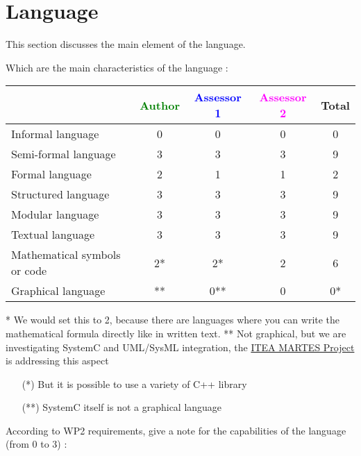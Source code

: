 \section{Language}
This section discusses the main element of the language.

Which are the main characteristics of the language :

\begin{tabular}{|l | c | c | c | c|}
\hline
& \textcolor{green}{Author} & \textcolor{blue}{Assessor 1} & \textcolor{magenta}{Assessor 2} & Total \\
\hline
Informal language &0 & 0 & 0 & 0 \\
\hline
Semi-formal language &3 & 3& 3 & 9 \\
\hline
Formal language &2 &1 & 1 & 2 \\
\hline
Structured language &3 &3 & 3 & 9 \\
\hline
Modular language &3 &3 & 3 & 9  \\
\hline
Textual language &3 &3 & 3 & 9 \\
\hline
Mathematical symbols or code &2* &2* & 2 & 6 \\
\hline
Graphical language &** & 0**& 0 &  0* \\
\hline
\end{tabular}

\begin{author_comment}
* We would set this to 2, because there are languages where you can write the mathematical formula directly like in written text.
** Not graphical, but we are investigating SystemC and UML/SysML integration, the \href{http://www.martes-idea.org/}{ITEA MARTES Project} is addressing this aspect
\end{author_comment}
\begin{assessor1}
\begin{itemize}
\item[(*)] But it is possible to use a variety of C++ library
\item[(**)] SystemC itself is not a graphical language
\end{itemize}
\end{assessor1}

According to WP2 requirements, give a note for the capabilities of the language (from 0 to 3) :

